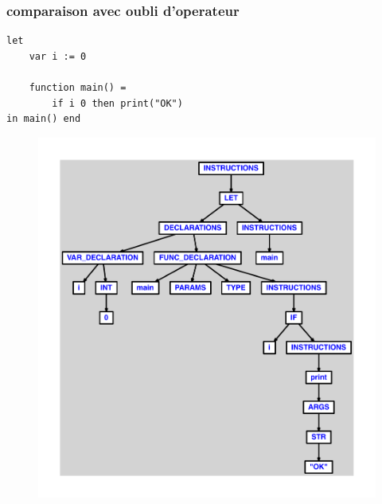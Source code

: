 \documentclass{article}
\begin{document}
\subsubsection{comparaison avec oubli d'operateur}
\begin{lstlisting}
let
	var i := 0

	function main() =
		if i 0 then print("OK")
in main() end
\end{lstlisting}
\newpage
\begin{figure}[H]
\centering
\includegraphics[max width=\textwidth]{ast/ast_165.pdf}
\end{figure}
\newpage
\end{document}
